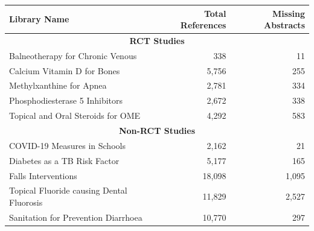\begin{tabularx}{\textwidth}{@{} X r r @{}}
\toprule
\textbf{Library Name} & \textbf{Total References} & \textbf{Missing Abstracts} \\
\midrule
\multicolumn{3}{c}{\textbf{RCT Studies}} \\
\midrule
Balneotherapy for Chronic Venous~\cite{balneotherapy_for_chronic_venous} & 338 & 11 \\
Calcium Vitamin D for Bones~\cite{calcium_vitamin_d_for_bones} & 5,756 & 255 \\
Methylxanthine for Apnea~\cite{methylxanthine_for_apnea} & 2,781 & 334 \\
Phosphodiesterase 5 Inhibitors~\cite{phosphodiestrase_5_inhibitors} & 2,672 & 338 \\
Topical and Oral Steroids for OME~\cite{topical_and_oral_steroids_for_om} & 4,292 & 583 \\
\midrule
\multicolumn{3}{c}{\textbf{Non-RCT Studies}} \\
\midrule
COVID-19 Measures in Schools~\cite{non_rct_covid_schools} & 2,162 & 21 \\
Diabetes as a TB Risk Factor~\cite{non_rct_diabetes_tb} & 5,177 & 165 \\
Falls Interventions~\cite{non_rct_falls_prevention} & 18,098 & 1,095 \\
Topical Fluoride causing Dental Fluorosis~\cite{non_rct_fluoride_fluorosis} & 11,829 & 2,527 \\
Sanitation for Prevention Diarrhoea~\cite{non_rct_sanitation_diarrhoea} & 10,770 & 297 \\
\bottomrule
\end{tabularx}